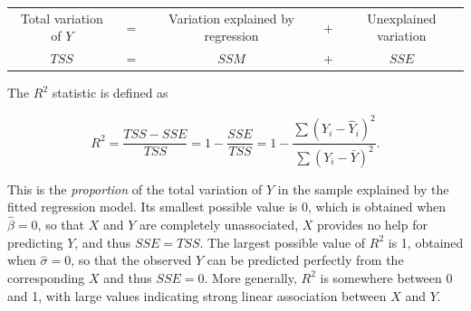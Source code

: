 \documentclass[11pt,a4paper,openany]{book}
\begin{document}
\begin{longtable}[]{@{}ccccc@{}}
\toprule
\begin{minipage}[t]{0.26\columnwidth}\centering\strut
Total variation of \(Y\)\strut
\end{minipage} & \begin{minipage}[t]{0.06\columnwidth}\centering\strut
=\strut
\end{minipage} & \begin{minipage}[t]{0.22\columnwidth}\centering\strut
Variation explained by regression\strut
\end{minipage} & \begin{minipage}[t]{0.06\columnwidth}\centering\strut
+\strut
\end{minipage} & \begin{minipage}[t]{0.24\columnwidth}\centering\strut
Unexplained variation\strut
\end{minipage}\tabularnewline
\begin{minipage}[t]{0.26\columnwidth}\centering\strut
\(TSS\)\strut
\end{minipage} & \begin{minipage}[t]{0.06\columnwidth}\centering\strut
\(=\)\strut
\end{minipage} & \begin{minipage}[t]{0.22\columnwidth}\centering\strut
\(SSM\)\strut
\end{minipage} & \begin{minipage}[t]{0.06\columnwidth}\centering\strut
\(+\)\strut
\end{minipage} & \begin{minipage}[t]{0.24\columnwidth}\centering\strut
\(SSE\)\strut
\end{minipage}\tabularnewline
\bottomrule
\end{longtable}

The \(R^{2}\) statistic is defined as

\begin{equation}R^{2}= \frac{TSS-SSE}{TSS} = 1-\frac{SSE}{TSS}
=1-\frac{\sum (Y_{i}-\hat{Y}_{i})^{2}}{
\sum (Y_{i}-\bar{Y})^{2}}.
\label{eq:R2}\end{equation}

This is the \emph{proportion} of the total variation of \(Y\) in the
sample explained by the fitted regression model. Its smallest possible
value is 0, which is obtained when \(\hat{\beta}=0\), so that \(X\) and
\(Y\) are completely unassociated, \(X\) provides no help for predicting
\(Y\), and thus \(SSE=TSS\). The largest possible value of \(R^{2}\) is
1, obtained when \(\hat{\sigma}=0\), so that the observed \(Y\) can be
predicted perfectly from the corresponding \(X\) and thus \(SSE=0\).
More generally, \(R^{2}\) is somewhere between 0 and 1, with large
values indicating strong linear association between \(X\) and \(Y\).
\end{document}
